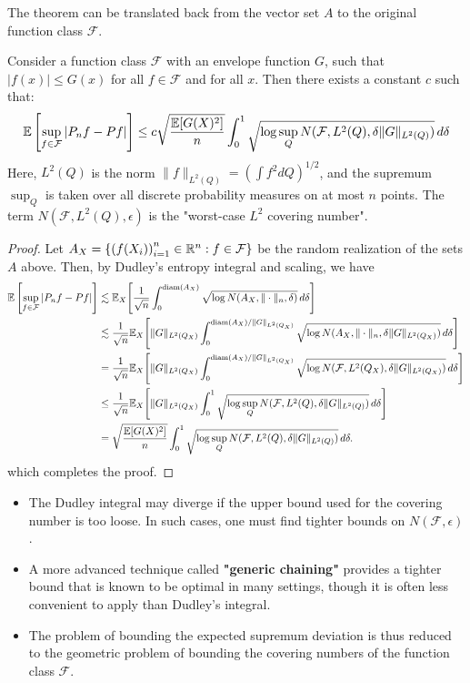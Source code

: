 The theorem can be translated back from the vector set $A$ to the original function class $\mathcal{F}$.

\begin{thm}
Consider a function class $\mathcal{F}$ with an envelope function $G$, such that $|f(x)| \le G(x)$ for all $f \in \mathcal{F}$ and for all $x$. Then there exists a constant $c$ such that:
$$ \mathbb{E}\left[\sup_{f \in \mathcal{F}} |P_n f - Pf|\right] \le c \sqrt{\frac{\mathbb{E}[G(X)^2]}{n}} \int_0^1 \sqrt{\log \sup_Q N(\mathcal{F}, L^2(Q), \delta \|G\|_{L^2(Q)})} \, d\delta $$
Here, $L^2(Q)$ is the norm $\|f\|_{L^2(Q)} = (\int f^2 dQ)^{1/2}$, and the supremum $\sup_Q$ is taken over all discrete probability measures on at most $n$ points. The term $N(\mathcal{F}, L^2(Q), \epsilon)$ is the "worst-case $L^2$ covering number".
\end{thm}

\begin{proof}
    Let $A_X=\left\{\left(f(X_i)\right)_{i=1}^n\in \mathbb{R}^n:f\in\mathcal{F}\right\}$ be the random realization of the sets $A$ above. Then, by Dudley's entropy integral and scaling, we have
    \begin{align*}
        \E\left[\sup_{f \in \mathcal{F}} |P_n f - Pf|\right]&\lesssim \E_X\brackets*{ \frac{1}{\sqrt{n}} \int_0^{\operatorname{diam}(A_X)} \sqrt{\log N(A_X, \|\cdot\|_n, \delta)} \, d\delta}\\
        &\lesssim \frac{1}{\sqrt{n}}\E_X\brackets*{ \|G\|_{L^2(Q_X)} \int_0^{\operatorname{diam}(A_X)/\|G\|_{L^2(Q_X)}} \sqrt{\log N(A_X, \|\cdot\|_n, \delta\|G\|_{L^2(Q_X)})} \, d\delta}\\
        &=\frac{1}{\sqrt{n}}\E_X\brackets*{ \|G\|_{L^2(Q_X)} \int_0^{\operatorname{diam}(A_X)/\|G\|_{L^2(Q_X)}} \sqrt{\log N(\mathcal{F}, L^2(Q_X), \delta \|G\|_{L^2(Q_X)})} \, d\delta}\\
        &\le \frac{1}{\sqrt{n}}\E_X\brackets*{ \|G\|_{L^2(Q_X)} \int_0^{1} \sqrt{\log \sup_Q N(\mathcal{F}, L^2(Q), \delta \|G\|_{L^2(Q)})} \, d\delta}\\
        &= \sqrt{\frac{\E[G(X)^2]}{n}} \int_0^{1} \sqrt{\log \sup_Q N(\mathcal{F}, L^2(Q), \delta \|G\|_{L^2(Q)})} \, d\delta.
    \end{align*}
    which completes the proof.
\end{proof}

\begin{remark}
    \begin{itemize}
    \item The Dudley integral may diverge if the upper bound used for the covering number is too loose. In such cases, one must find tighter bounds on $N(\mathcal{F}, \epsilon)$.
    \item A more advanced technique called \textbf{"generic chaining"} provides a tighter bound that is known to be optimal in many settings, though it is often less convenient to apply than Dudley's integral.
    \item The problem of bounding the expected supremum deviation is thus reduced to the geometric problem of bounding the covering numbers of the function class $\mathcal{F}$.
\end{itemize}
\end{remark}

